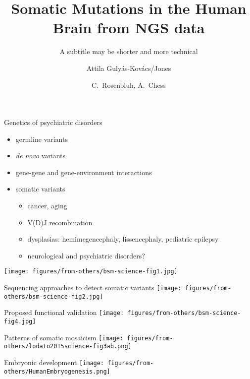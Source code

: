 \documentclass{beamer}
\title[Somatic Mutations in the Brain]{Somatic Mutations in the Human Brain from NGS data}
\subtitle{A subtitle may be shorter and more technical}
\author{Attila Guly\'{a}s-Kov\'{a}cs/Jones}
\date{C.~Rosenbluh, A.~Chess}
\begin{document}
\maketitle

\begin{frame}{Genetics of psychiatric disorders}
\begin{itemize}
\item germline variants
\item \textit{de novo} variants
\item<2-> gene-gene and gene-environment interactions  
\item<3-> somatic variants
\begin{itemize}
\item cancer, aging
\item V(D)J recombination
\item dysplasias: hemimegencephaly, lissencephaly, pediatric epilepsy 
\item<4-> \alert{neurological and psychiatric disorders?}
\end{itemize}
\end{itemize}
\end{frame}

\begin{frame}
\texttt{[image: figures/from-others/bsm-science-fig1.jpg]}
\end{frame}

\begin{frame}[label=bsm-methods]{Sequencing approaches to detect somatic variants}
\texttt{[image: figures/from-others/bsm-science-fig2.jpg]}
\end{frame}

\begin{frame}{Proposed functional validation}
\texttt{[image: figures/from-others/bsm-science-fig4.jpg]}
\end{frame}

\begin{frame}{Patterns of somatic mosaicism}
\texttt{[image: figures/from-others/lodato2015science-fig3ab.png]}
\end{frame}

\begin{frame}{Embryonic development}
\texttt{[image: figures/from-others/HumanEmbryogenesis.png]}
\end{frame}
\end{document}
